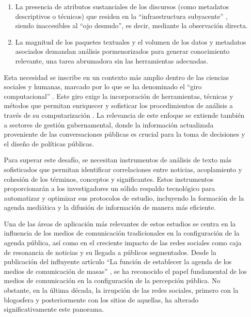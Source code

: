 \documentclass[12pt]{report}
\begin{document}
\begin{enumerate}
  \item La presencia de atributos sustanciales de los discursos (como metadatos descriptivos o técnicos) que residen en la ``infraestructura subyacente'' \citep{couldry:2017}, siendo inaccesibles al ``ojo desnudo'', es decir, mediante la observación directa.

  \item La magnitud de los paquetes textuales y el volumen de los datos y metadatos asociados demandan análisis pormenorizados para generar conocimiento relevante, una tarea abrumadora sin las herramientas adecuadas.
\end{enumerate}

Esta necesidad se inscribe en un contexto más amplio dentro de las ciencias sociales y humanas, marcado por lo que se ha denominado el ``giro computacional'' \citep{berry:2011}. Este giro exige la incorporación de herramientas, técnicas y métodos que permitan enriquecer y sofisticar los procedimientos de análisis a través de su computarización \citep{meunier:2021}. La relevancia de este enfoque se extiende también a sectores de gestión gubernamental, donde la información actualizada proveniente de las conversaciones públicas es crucial para la toma de decisiones y el diseño de políticas públicas.


Para superar este desafío, se necesitan instrumentos de análisis de texto más sofisticados que permitan identificar correlaciones entre noticias, acoplamiento y cohesión de los términos, conceptos y significantes. Estos instrumentos proporcionarán a los investigadores un sólido respaldo tecnológico para automatizar y optimizar sus protocolos de estudio, incluyendo la formación de la agenda mediática y la difusión de información de manera más eficiente.


Una de las áreas de aplicación más relevantes de estos estudios se centra en la influencia de los medios de comunicación tradicionales en la configuración de la agenda pública, así como en el creciente impacto de las redes sociales como caja de resonancia de noticias y su llegada a públicos segmentados. Desde la publicación del influyente artículo ``La función de establecer la agenda de los medios de comunicación de masas'' \citep{mccombs:1972}, se ha reconocido el papel fundamental de los medios de comunicación en la configuración de la percepción pública. No obstante, en la última década, la irrupción de las redes sociales, primero con la blogosfera y posteriormente con los sitios de aquellas, ha alterado significativamente este panorama.
\end{document}
